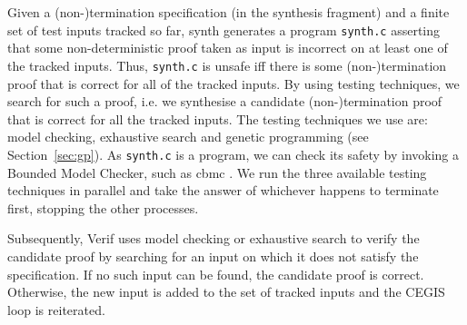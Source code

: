 Given a (non-)termination specification (in the synthesis fragment)    
and a finite set of test inputs tracked so far, {\sc synth} generates a program \texttt{synth.c} asserting that some non-deterministic proof taken as input  
is incorrect on at least one of the tracked inputs.
Thus, \texttt{synth.c} is unsafe iff there is some (non-)termination proof that is correct for all of the tracked inputs.  
By using testing techniques, we search for such a proof, i.e. 
we synthesise a candidate (non-)termination proof that is correct for all the tracked inputs.  
The testing techniques we use are: model checking,
exhaustive search and genetic programming (see Section~\ref{sec:gp}).  
As \texttt{synth.c}
is a \newC program, we can check its safety by invoking a Bounded
Model Checker, such as {\sc cbmc} \cite{}.
We run the three available testing techniques %
in parallel and take the answer of whichever happens
to terminate first, stopping the other processes.  


Subsequently, {\sc Verif} uses model checking or exhaustive search to verify the candidate proof by searching for an input on
which it does not satisfy the specification. If no such input
can be found, the candidate proof is correct.  Otherwise, the new input is added
to the set of tracked inputs and the CEGIS loop is reiterated.  










